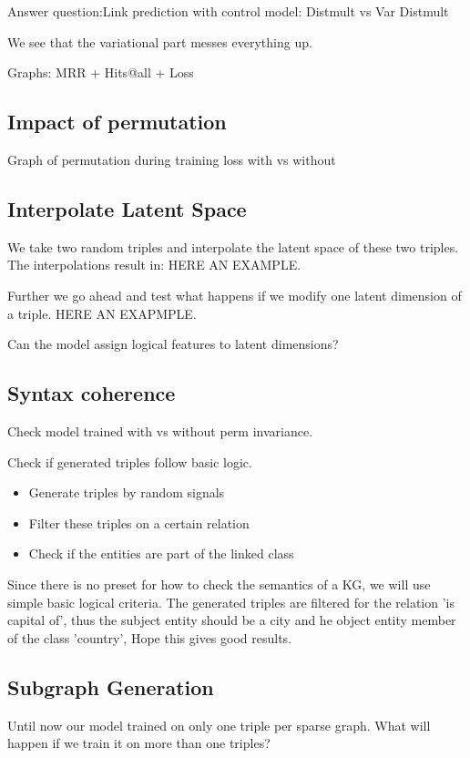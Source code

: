 Answer question:Link prediction with control model:
Distmult vs Var Distmult

We see that the variational part messes everything up.

Graphs:
MRR + Hits@all + Loss

\subsection{Impact of permutation}

Graph of permutation during training
loss with vs without 

\subsection{Interpolate Latent Space}
We take two random triples and interpolate the latent space of these two triples. The interpolations result in: HERE AN EXAMPLE.

Further we go ahead and test what happens if we modify one latent dimension of a triple. HERE AN EXAPMPLE.

Can the model assign logical features to latent dimensions?


\subsection{Syntax coherence}

Check model trained with vs without perm invariance.

Check if generated triples follow basic logic.
\begin{itemize}
    \item Generate triples by random signals
    \item Filter these triples on a certain relation
    \item Check if the entities are part of the linked class
\end{itemize}

Since there is no preset for how to check the semantics of a KG, we will use simple basic logical criteria.
The generated triples are filtered for the relation 'is capital of', thus the subject entity should be a city and he object entity member of the class 'country',
Hope this gives good results.


\subsection{Subgraph Generation}
Until now our model trained on only one triple per sparse graph. What will happen if we train it on more than one triples?
